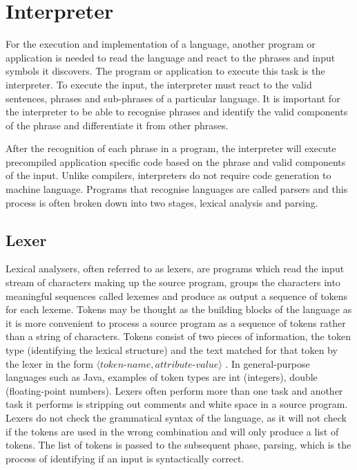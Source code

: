\section{Interpreter}

For the execution and implementation of a language, another program or application is needed to read the language and react to the phrases and input symbols it discovers. The program or application to execute this task is the interpreter. To execute the input, the interpreter must react to the valid sentences, phrases and sub-phrases of a particular language. It is important for the interpreter to be able to recognise phrases and identify the valid components of the phrase and differentiate it from other phrases. \newline \par

After the recognition of each phrase in a program, the interpreter will execute precompiled application specific code based on the phrase and valid components of the input. Unlike compilers, interpreters do not require code generation to machine language. Programs that recognise languages are called parsers and this process is often broken down into two stages, lexical analysis and parsing.

\subsection{Lexer}

Lexical analysers, often referred to as lexers, are programs which read the input stream of characters making up the source program, groups the characters into meaningful sequences called lexemes and produce as output a sequence of tokens for each lexeme. Tokens may be thought as the building blocks of the language as it is more convenient to process a source program as a sequence of tokens rather than a string of characters. Tokens consist of two pieces of information, the token type (identifying the lexical structure) and the text matched for that token by the lexer in the form $\langle \textit{token-name}, \textit{attribute-value} \rangle$ \cite{aho2003compilers}. In general-purpose languages such as Java, examples of token types are int (integers), double (floating-point numbers). Lexers often perform more than one task and another task it performs is stripping out comments and white space in a source program. Lexers do not check the grammatical syntax of the language, as it will not check if the tokens are used in the wrong combination and will only produce a list of tokens. The list of tokens is passed to the subsequent phase, parsing, which is the process of identifying if an input is syntactically correct. 

